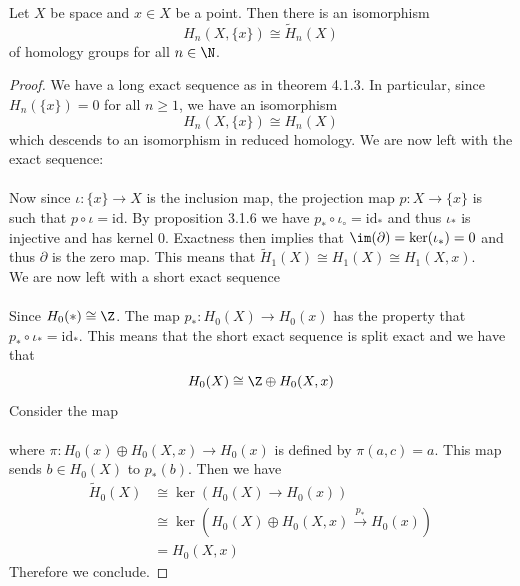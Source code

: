 \documentclass[a4paper]{article}
\begin{document}
\begin{lmm}{}{} Let $X$ be space and $x\in X$ be a point. Then there is an isomorphism $$H_n(X,\{x\})\cong\widetilde{H}_n(X)$$ of homology groups for all $n\in\N$. 
\begin{proof}
We have a long exact sequence as in theorem 4.1.3. In particular, since $H_n(\{x\})=0$ for all $n\geq 1$, we have an isomorphism $$H_n(X,\{x\})\cong H_n(X)$$ which descends to an isomorphism in reduced homology. We are now left with the exact sequence: \\
\\
Now since $\iota:\{x\}\to X$ is the inclusion map, the projection map $p:X\to\{x\}$ is such that $p\circ\iota=\text{id}$. By proposition 3.1.6 we have $p_\ast\circ\iota_\circ=\text{id}_\ast$ and thus $\iota_\ast$ is injective and has kernel $0$. Exactness then implies that $\im(\partial)=\ker(\iota_\ast)=0$ and thus $\partial$ is the zero map. This means that $\tilde{H}_1(X)\cong H_1(X)\cong H_1(X,x)$. \\

We are now left with a short exact sequence\\
\\
Since $H_0(\ast)\cong\Z$. The map $p_\ast:H_0(X)\to H_0(x)$ has the property that $p_\ast\circ\iota_\ast=\text{id}_\ast$. This means that the short exact sequence is split exact and we have that $$H_0(X)\cong\Z\oplus H_0(X,x)$$ Consider the map \\
\\
where $\pi:H_0(x)\oplus H_0(X,x)\to H_0(x)$ is defined by $\pi(a,c)=a$. This map sends $b\in H_0(X)$ to $p_\ast(b)$. Then we have 
\begin{align*}
\widetilde{H}_0(X)&\cong\ker(H_0(X)\to H_0(x))\\
&\cong\ker(H_0(X)\oplus H_0(X,x)\overset{p_\ast}{\to}H_0(x))\\
&=H_0(X,x)
\end{align*}
Therefore we conclude. 
\end{proof}
\end{lmm}
\end{document}

